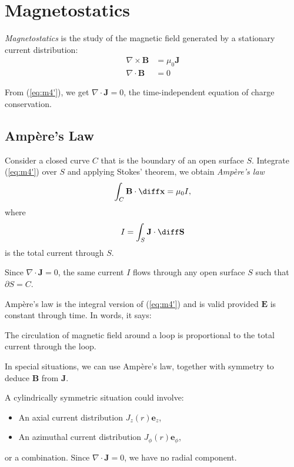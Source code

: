 \documentclass[12pt]{article}
\begin{document}
\newpage

\section{Magnetostatics}
\label{sec:magnetostatics}

\emph{Magnetostatics} is the study of the magnetic field generated by a stationary current distribution:
\begin{align*}
	\nabla \times \mathbf{B} &= \mu_0 \mathbf{J} \tag{M4'}\label{eq:m4'}\\
	\nabla \cdot \mathbf{B} &= 0 \tag{M2}\label{eq:m2}
\end{align*}

From (\ref{eq:m4'}), we get $\nabla \cdot \mathbf{J} = 0$, the time-independent equation of charge conservation.

\subsection{Amp\`{e}re's Law}
\label{sub:amperes_law}

Consider a closed curve $C$ that is the boundary of an open surface $S$. Integrate (\ref{eq:m4'}) over $S$ and applying Stokes' theorem, we obtain \emph{Amp\`{e}re's law}
\[
\int_{C} \mathbf{B} \cdot \diff \mathbf{x} = \mu_0 I
,\]
where
\[
I = \int_{S} \mathbf{J} \cdot \diff \mathbf{S}
\]
is the total current through $S$.

Since $\nabla \cdot \mathbf{J} = 0$, the same current $I$ flows through any open surface $S$ such that $\partial S = C$.

Amp\`{e}re's law is the integral version of (\ref{eq:m4'}) and is valid provided $\mathbf{E}$ is constant through time. In words, it says:
\begin{center}
	The circulation of magnetic field around a loop is proportional to the total current through the loop.
\end{center}

In special situations, we can use Amp\`{e}re's law, together with symmetry to deduce $\mathbf{B}$ from $\mathbf{J}$.

A cylindrically symmetric situation could involve:
\begin{itemize}
	\item An axial current distribution $J_z(r)\mathbf{e}_z$,
	\item An azimuthal current distribution $J_{\phi}(r)\mathbf{e}_{\phi}$,
\end{itemize}
or a combination. Since $\nabla \cdot \mathbf{J} = 0$, we have no radial component.
\end{document}
